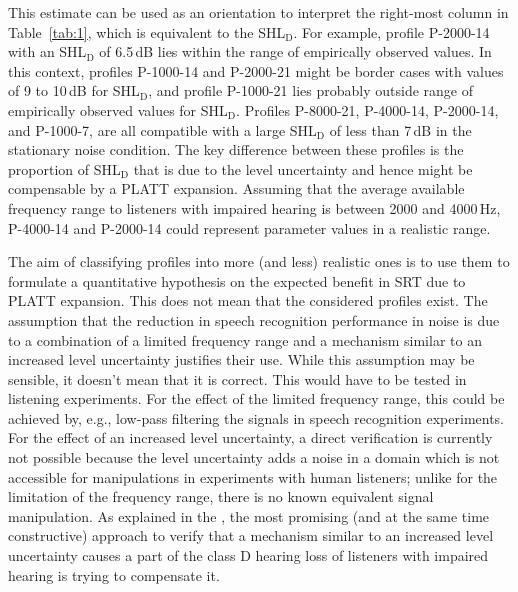 \documentclass[10pt,a4paper,twocolumn]{article}
\begin{document}
This estimate can be used as an orientation to interpret the right-most column in Table~\ref{tab:1}, which is equivalent to the SHL$_\text{D}$.
%
For example, profile P-2000-14 with an SHL$_\text{D}$ of 6.5\,dB lies within the range of empirically observed values.
%
In this context, profiles P-1000-14 and P-2000-21 might be border cases with values of 9 to 10\,dB for SHL$_\text{D}$, and profile P-1000-21 lies probably outside range of empirically observed values for SHL$_\text{D}$.
%
Profiles P-8000-21, P-4000-14, P-2000-14, and P-1000-7, are all compatible with a large SHL$_\text{D}$ of less than 7\,dB in the stationary noise condition.
%
The key difference between these profiles is the proportion of SHL$_\text{D}$ that is due to the level uncertainty and hence might be compensable by a PLATT expansion. 
%
Assuming that the average available frequency range to listeners with impaired hearing is between 2000 and 4000\,Hz, P-4000-14 and P-2000-14 could represent parameter values in a realistic range.

The aim of classifying profiles into more (and less) realistic ones is to use them to formulate a quantitative hypothesis on the expected benefit in SRT due to PLATT expansion.
%
This does not mean that the considered profiles exist.
%
The assumption that the reduction in speech recognition performance in noise is due to a combination of a limited frequency range and a mechanism similar to an increased level uncertainty justifies their use.
%
While this assumption may be sensible, it doesn't mean that it is correct.
%
This would have to be tested in listening experiments.
%
For the effect of the limited frequency range, this could be achieved by, e.g., low-pass filtering the signals in speech recognition experiments.
%
For the effect of an increased level uncertainty, a direct verification is currently not possible because the level uncertainty adds a noise in a domain which is not accessible for manipulations in experiments with human listeners; unlike for the limitation of the frequency range, there is no known equivalent signal manipulation.
%
As explained in the , the most promising (and at the same time constructive) approach to verify that a mechanism similar to an increased level uncertainty causes a part of the class D hearing loss of listeners with impaired hearing is trying to compensate it.
\end{document}
